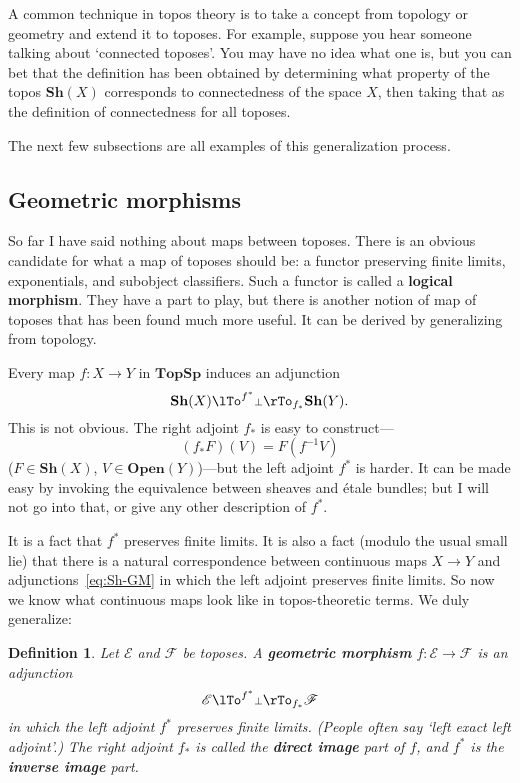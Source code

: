 \documentclass{article}
\newcommand{\cat}[1]{\mathscr{#1}}
\newcommand{\fcat}[1]{\mathbf{#1}}
\newcommand{\demph}[1]{\textbf{\textup{#1}}}
\newcommand{\chunk}[1]{\subsection*{#1}}
\newcommand{\E}{\cat{E}}
\newcommand{\F}{\cat{F}}
\newcommand{\Sh}{\fcat{Sh}}
\newcommand{\Open}{\fcat{Open}}
\newcommand{\TopSp}{\fcat{TopSp}}
\newcommand{\dbot}{{\scriptstyle\bot}}
\newcommand{\cln}{\colon}
\newtheorem{predefn}[thm]{Definition}
\newenvironment{defn}{\begin{predefn}\upshape}{\end{predefn}}
\begin{document}
A common technique in topos theory is to take a concept from topology or
geometry and extend it to toposes.  For example, suppose you hear someone
talking about `connected toposes'.  You may have no idea what one is, but you
can bet that the definition has been obtained by determining what
property of the topos $\Sh(X)$ corresponds to connectedness of the space
$X$, then taking that as the definition of connectedness for all toposes.

The next few subsections are all examples of this generalization process.  


\chunk{Geometric morphisms}


So far I have said nothing about maps between toposes.  There is an obvious
candidate for what a map of toposes should be: a functor preserving finite
limits, exponentials, and subobject classifiers.  Such a functor is called a
\demph{logical morphism}.  They have a part to play, but there is another
notion of map of toposes that has been found much more useful.  It can be
derived by generalizing from topology.

Every map $f\cln X \to Y$ in $\TopSp$ induces an adjunction
% 
\begin{equation}        \label{eq:Sh-GM}
\Sh(X)
\pile{\lTo^{f^*}\\ \dbot\\ \rTo_{f_*}}
\Sh(Y).
\end{equation}
% 
This is not obvious.  The right adjoint $f_*$ is easy to construct---
\[
(f_* F)(V) = F(f^{-1} V)
\]
($F \in \Sh(X)$, $V \in \Open(Y)$)---but the left adjoint $f^*$ is harder.  It
can be made easy by invoking the equivalence between sheaves and \'etale
bundles; but I will not go into that, or give any other description of $f^*$.

It is a fact that $f^*$ preserves finite limits.  It is also a fact (modulo
the usual small lie) that there is a natural correspondence between continuous
maps $X \to Y$ and adjunctions~\eqref{eq:Sh-GM} in which the left adjoint
preserves finite limits.  So now we know what continuous maps look like in
topos-theoretic terms.  We duly generalize:

\begin{defn}    \label{defn:GM}
Let $\E$ and $\F$ be toposes.  A \demph{geometric morphism} $f\cln \E \to \F$
is an adjunction
\[
\E \pile{\lTo^{f^*}\\ \dbot\\ \rTo_{f_*}} \F
\]
in which the left adjoint $f^*$ preserves finite limits.  (People often say
`left exact left adjoint'.)  The right adjoint $f_*$ is called the
\demph{direct image} part of $f$, and $f^*$ is the \demph{inverse image} part.
\end{defn}
\end{document}
